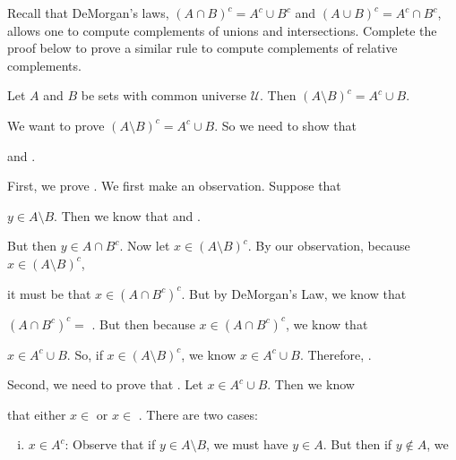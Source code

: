 \documentclass[12pt,letterpaper]{exam}
\begin{document}
\begin{questions}
\newpage
\question[10] Recall that DeMorgan's laws, $(A \cap B)^c= A^c \cup B^c$ and $(A \cup B)^c= A^c \cap B^c$, allows one to compute complements of unions and intersections. Complete the proof below to prove a similar rule to compute complements of relative complements. \pspace

 Let $A$ and $B$ be sets with common universe $\mathcal{U}$. Then $(A \setminus B)^c= A^c \cup B$. \pspace

 We want to prove $(A \setminus B)^c= A^c \cup B$. So we need to show that \underline{\hspace{4cm}} \pspace

and \underline{\hspace{4cm}}. \pspace \pspace


First, we prove \underline{\hspace{4cm}}. We first make an observation. Suppose that \pspace

$y \in A \setminus B$. Then we know that \underline{\hspace{4cm}} and \underline{\hspace{4cm}}. \pspace


But then $y \in A \cap B^c$. Now let $x \in (A \setminus B)^c$. By our observation, because $x \in (A \setminus B)^c$, \pspace

it must be that $x \in (A \cap B^c)^c$. But by DeMorgan's Law, we know that \pspace

$(A \cap B^c)^c=$ \underline{\hspace{4cm}}. But then because $x \in (A \cap B^c)^c$, we know that \pspace

$x \in A^c \cup B$. So, if $x \in (A \setminus B)^c$, we know $x \in A^c \cup B$. Therefore, \underline{\hspace{4cm}}. \pvspace{1.5cm}


Second, we need to prove that \underline{\hspace{4cm}}. Let $x \in A^c \cup B$. Then we know \pspace

that either $x \in$ \underline{\hspace{4cm}} or $x \in$ \underline{\hspace{4cm}}. There are two \pspace cases: \pspace

	\begin{enumerate}[(i)]
	\item $x \in A^c$: Observe that if $y \in A \setminus B$, we must have $y \in A$. But then if $y \notin A$, we \pspace
	

\end{enumerate}
\end{questions}
\end{document}
